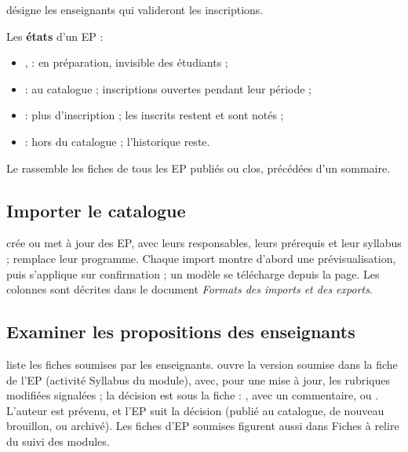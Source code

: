 \documentclass[11pt,a4paper]{article}
\begin{document}

 désigne les enseignants qui valideront les inscriptions.


Les \textbf{états} d'un EP :
\begin{itemize}
  \item {},  : en préparation, invisible des étudiants ;
  \item {} : au catalogue ; inscriptions ouvertes pendant leur période ;
  \item {} : plus d'inscription ; les inscrits restent et sont notés ;
  \item {} : hors du catalogue ; l'historique reste.
\end{itemize}

Le  rassemble les fiches de tous les EP publiés ou clos, précédées
d'un sommaire.


\subsection{Importer le catalogue}

 crée ou met à jour des EP, avec leurs
responsables, leurs prérequis et leur syllabus ;  remplace leur programme. Chaque import montre d'abord une prévisualisation, puis
s'applique sur confirmation ; un modèle se télécharge depuis la page. Les colonnes sont
décrites dans le document \emph{Formats des imports et des exports}.


\subsection{Examiner les propositions des enseignants}\label{sec:propositions}

 liste les fiches soumises par les enseignants.
 ouvre la version soumise dans la fiche de l'EP (activité \og Syllabus du
module\fg{}), avec, pour une mise à jour, les rubriques modifiées signalées ; la décision est
sous la fiche : ,  avec un commentaire, ou
. L'auteur est prévenu, et l'EP suit la décision (publié au catalogue, de
nouveau brouillon, ou archivé). Les fiches d'EP soumises figurent aussi dans \og Fiches à
relire\fg{} du suivi des modules.
\end{document}
